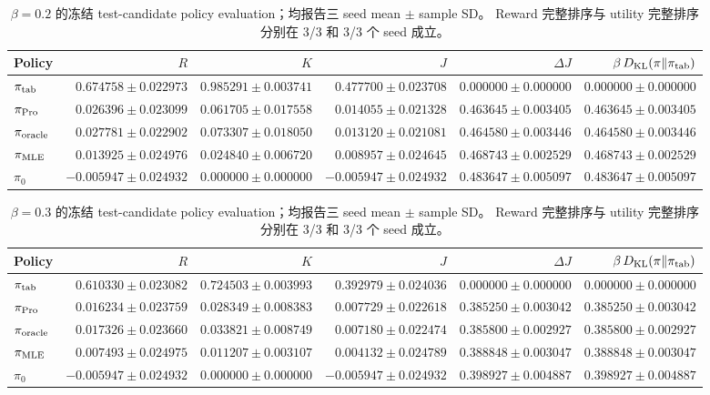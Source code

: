 \begin{table}[tbp]
\centering
\scriptsize
\setlength{\tabcolsep}{3.0pt}
\begin{tabular}{lrrrrr}
\toprule
Policy & $R$ & $K$ & $J$ & $\Delta J$ & $\beta\,D_{\mathrm{KL}}(\pi\|\pi_{\rm tab})$ \\
\midrule
$\pi_{\rm tab}$ & $0.674758 \pm 0.022973$ & $0.985291 \pm 0.003741$ & $0.477700 \pm 0.023708$ & $0.000000 \pm 0.000000$ & $0.000000 \pm 0.000000$ \\
$\pi_{\rm Pro}$ & $0.026396 \pm 0.023099$ & $0.061705 \pm 0.017558$ & $0.014055 \pm 0.021328$ & $0.463645 \pm 0.003405$ & $0.463645 \pm 0.003405$ \\
$\pi_{\rm oracle}$ & $0.027781 \pm 0.022902$ & $0.073307 \pm 0.018050$ & $0.013120 \pm 0.021081$ & $0.464580 \pm 0.003446$ & $0.464580 \pm 0.003446$ \\
$\pi_{\rm MLE}$ & $0.013925 \pm 0.024976$ & $0.024840 \pm 0.006720$ & $0.008957 \pm 0.024645$ & $0.468743 \pm 0.002529$ & $0.468743 \pm 0.002529$ \\
$\pi_0$ & $-0.005947 \pm 0.024932$ & $0.000000 \pm 0.000000$ & $-0.005947 \pm 0.024932$ & $0.483647 \pm 0.005097$ & $0.483647 \pm 0.005097$ \\
\bottomrule
\end{tabular}
\caption{$\beta=0.2$ 的冻结 test-candidate policy evaluation；均报告三 seed mean $\pm$ sample SD。 Reward 完整排序与 utility 完整排序分别在 3/3 和 3/3 个 seed 成立。}
\label{tab:main-policy-02}
\end{table}

\begin{table}[tbp]
\centering
\scriptsize
\setlength{\tabcolsep}{3.0pt}
\begin{tabular}{lrrrrr}
\toprule
Policy & $R$ & $K$ & $J$ & $\Delta J$ & $\beta\,D_{\mathrm{KL}}(\pi\|\pi_{\rm tab})$ \\
\midrule
$\pi_{\rm tab}$ & $0.610330 \pm 0.023082$ & $0.724503 \pm 0.003993$ & $0.392979 \pm 0.024036$ & $0.000000 \pm 0.000000$ & $0.000000 \pm 0.000000$ \\
$\pi_{\rm Pro}$ & $0.016234 \pm 0.023759$ & $0.028349 \pm 0.008383$ & $0.007729 \pm 0.022618$ & $0.385250 \pm 0.003042$ & $0.385250 \pm 0.003042$ \\
$\pi_{\rm oracle}$ & $0.017326 \pm 0.023660$ & $0.033821 \pm 0.008749$ & $0.007180 \pm 0.022474$ & $0.385800 \pm 0.002927$ & $0.385800 \pm 0.002927$ \\
$\pi_{\rm MLE}$ & $0.007493 \pm 0.024975$ & $0.011207 \pm 0.003107$ & $0.004132 \pm 0.024789$ & $0.388848 \pm 0.003047$ & $0.388848 \pm 0.003047$ \\
$\pi_0$ & $-0.005947 \pm 0.024932$ & $0.000000 \pm 0.000000$ & $-0.005947 \pm 0.024932$ & $0.398927 \pm 0.004887$ & $0.398927 \pm 0.004887$ \\
\bottomrule
\end{tabular}
\caption{$\beta=0.3$ 的冻结 test-candidate policy evaluation；均报告三 seed mean $\pm$ sample SD。 Reward 完整排序与 utility 完整排序分别在 3/3 和 3/3 个 seed 成立。}
\label{tab:main-policy-03}
\end{table}
